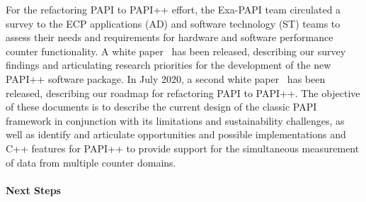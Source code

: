 For the refactoring PAPI to PAPI++ effort, the Exa-PAPI team circulated a survey to the ECP 
applications (AD) and software technology (ST) teams to assess their needs and requirements 
for hardware and software performance counter functionality. A white paper~\cite{PWN-2020-01} has been released, 
describing our survey findings and articulating research priorities for the development of the new 
PAPI++ software package.
In July 2020, a second white paper~\cite{PWN-2020-07} has been released, describing our roadmap for 
refactoring PAPI to PAPI++. The objective of these documents is to describe the current design of the
classic PAPI framework in conjunction with its limitations and sustainability challenges, as well as identify 
and articulate opportunities and possible implementations and C++ features for PAPI++ to provide support 
for the simultaneous measurement of data from multiple counter domains.



\paragraph{Next Steps}

